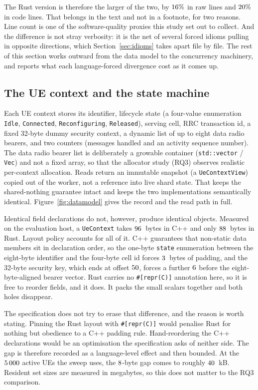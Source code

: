 \documentclass[english,oneside,a4paper,censored,csm,software-track-2020]{HYthesisML}
\begin{document}
The Rust version is therefore the larger of the two, by $16\%$ in raw lines and
$20\%$ in code lines. That belongs in the text and not in a footnote, for two reasons.
Line count is one of the software-quality proxies this study set out to collect. And the
difference is not stray verbosity: it is the net of several forced idioms pulling in opposite
directions, which Section~\ref{sec:idioms} takes apart file by file. The rest of this section
works outward from the data model to the concurrency machinery, and reports what each
language-forced divergence cost as it comes up.

\subsection{The UE context and the state machine}\label{sec:uecontext}
Each UE context stores its identifier, lifecycle state (a four-value enumeration
\texttt{Idle}, \texttt{Connected}, \texttt{Reconfiguring}, \texttt{Released}), serving cell,
RRC transaction id, a fixed 32-byte dummy security context, a dynamic list of up to eight data
radio bearers, and two counters (messages handled and an activity sequence number). The data
radio bearer list is deliberately a growable container (\texttt{std::vector} / \texttt{Vec})
and not a fixed array, so that the allocator study (RQ3) observes realistic per-context
allocation. Reads return an immutable snapshot (a \texttt{UeContextView}) copied out of the
worker, not a reference into live shard state. That keeps the shared-nothing guarantee intact
and keeps the two implementations semantically identical.
Figure~\ref{fig:datamodel} gives the record and the read path in full.

Identical field declarations do not, however, produce identical objects. Measured on the
evaluation host, a \texttt{UeContext} takes $96$~bytes in C++ and only
$88$~bytes in Rust.
Layout policy accounts for all of it. C++ guarantees that non-static data members sit
in declaration order, so the one-byte \texttt{state} enumeration between the
eight-byte identifier and the four-byte cell id forces $3$~bytes of padding, and the
32-byte security key, which ends at offset $50$, forces a further $6$ before the eight-byte-aligned
bearer vector. Rust carries no \texttt{\#[repr(C)]} annotation here, so it is free to reorder
fields, and it does. It packs the small scalars together and both holes disappear.

The specification does not try to erase that difference, and the reason is worth stating.
Pinning the Rust layout with \texttt{\#[repr(C)]} would penalise Rust for nothing but obedience
to a C++ padding rule. Hand-reordering the C++ declarations would be an optimisation the
specification asks of neither side. The gap is therefore recorded as a language-level effect and
then bounded. At the $5\,000$ active UEs the sweep uses, the $8$-byte gap comes
to roughly $40$~kB. Resident set sizes are measured in megabytes, so this does not
matter to the RQ3 comparison.
\end{document}
